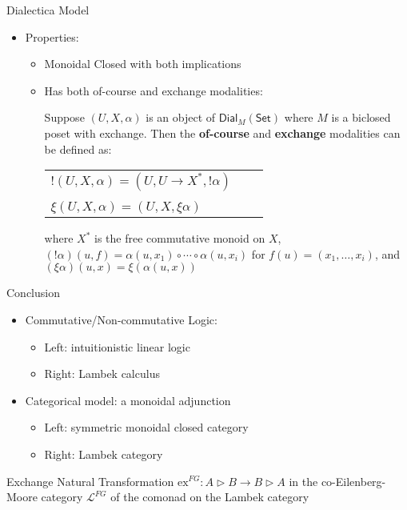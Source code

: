 \documentclass{beamer}
\newcommand{\Set}{\mathsf{Set}}
\newcommand{\Dial}[2]{\mathsf{Dial}_{#1}(#2)}
\begin{document}
\begin{frame}{Dialectica Model}
  \begin{itemize}
  \item[] Properties:
    \begin{itemize}
    \item Monoidal Closed with both implications
    \item Has both of-course and exchange modalities:
      \begin{definition}
        \label{def:modalities-dial}
        Suppose $(U, X, \alpha)$ is an object of $\Dial{M}{\Set}$ where $M$
        is a biclosed poset with exchange. Then the \textbf{of-course} and
        \textbf{exchange} modalities can be defined as:
        \begin{center}
            \begin{tabular}{lll}
              $! (U, X, \alpha) = (U, U \rightarrow X^*, !\alpha)$\\
              \\
              $\xi (U, X, \alpha) = (U, X, \xi \alpha)$              
            \end{tabular}
        \end{center}
        where $X^*$ is the free commutative monoid on $X$, $(!\alpha)(u, f)
        = \alpha(u, x_1) \circ \cdots \circ \alpha(u, x_i)$ for $f(u) =
        (x_1, \ldots, x_i)$, and $(\xi \alpha)(u, x) = \xi (\alpha(u,
        x))$
      \end{definition}
    \end{itemize}
  \end{itemize}
\end{frame}

\begin{frame}{Conclusion}

\begin{itemize}
\item Commutative/Non-commutative Logic:
      \begin{itemize}
      \item Left: intuitionistic linear logic
      \item Right: Lambek calculus
      \end{itemize}
\item Categorical model: a monoidal adjunction
      \begin{itemize}
      \item Left: symmetric monoidal closed category
      \item Right: Lambek category
      \end{itemize}
\end{itemize}

\begin{block}{Exchange Natural Transformation}
$\mathrm{ex}^{FG}:A\triangleright B\rightarrow B\triangleright A$ in the
co-Eilenberg-Moore category $\mathcal{L}^{FG}$ of the comonad on the Lambek
category
\end{block}

\end{frame}
\end{document}
